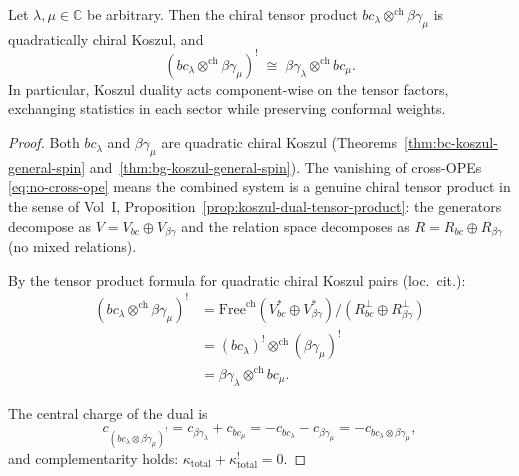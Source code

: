 \documentclass[11pt]{article}
\newcommand{\C}{\mathbb{C}}
\begin{document}
\begin{theorem}
\label{thm:koszul-tensor-bc-bg}
Let $\lambda, \mu \in \C$ be arbitrary.  Then the chiral tensor
product $bc_\lambda \otimes^{\mathrm{ch}} \beta\gamma_\mu$ is
quadratically chiral Koszul, and
\begin{equation}\label{eq:koszul-tensor}
(bc_\lambda \otimes^{\mathrm{ch}} \beta\gamma_\mu)^!
\;\cong\;
\beta\gamma_\lambda \otimes^{\mathrm{ch}} bc_\mu.
\end{equation}
In particular, Koszul duality acts component-wise on the tensor
factors, exchanging statistics in each sector while preserving
conformal weights.
\end{theorem}

\begin{proof}
Both $bc_\lambda$ and $\beta\gamma_\mu$ are quadratic chiral
Koszul (Theorems~\ref{thm:bc-koszul-general-spin}
and~\ref{thm:bg-koszul-general-spin}).  The vanishing of
cross-OPEs \eqref{eq:no-cross-ope} means the combined system
is a genuine chiral tensor product in the sense of
Vol~I, Proposition~\ref*{prop:koszul-dual-tensor-product}: the
generators decompose as $V = V_{bc} \oplus V_{\beta\gamma}$
and the relation space decomposes as $R = R_{bc} \oplus
R_{\beta\gamma}$ (no mixed relations).

By the tensor product formula for quadratic chiral Koszul
pairs (loc.\ cit.):
\begin{align*}
(bc_\lambda \otimes^{\mathrm{ch}} \beta\gamma_\mu)^!
&= \mathrm{Free}^{\mathrm{ch}}(V_{bc}^* \oplus V_{\beta\gamma}^*)
   /(R_{bc}^\perp \oplus R_{\beta\gamma}^\perp) \\
&= (bc_\lambda)^! \otimes^{\mathrm{ch}} (\beta\gamma_\mu)^! \\
&= \beta\gamma_\lambda \otimes^{\mathrm{ch}} bc_\mu.
\end{align*}

The central charge of the dual is
\[
c_{(bc_\lambda \otimes \beta\gamma_\mu)^!}
= c_{\beta\gamma_\lambda} + c_{bc_\mu}
= -c_{bc_\lambda} - c_{\beta\gamma_\mu}
= -c_{bc_\lambda \otimes \beta\gamma_\mu},
\]
and complementarity holds:
$\kappa_{\mathrm{total}} + \kappa_{\mathrm{total}}^! = 0$.
\end{proof}
\end{document}
